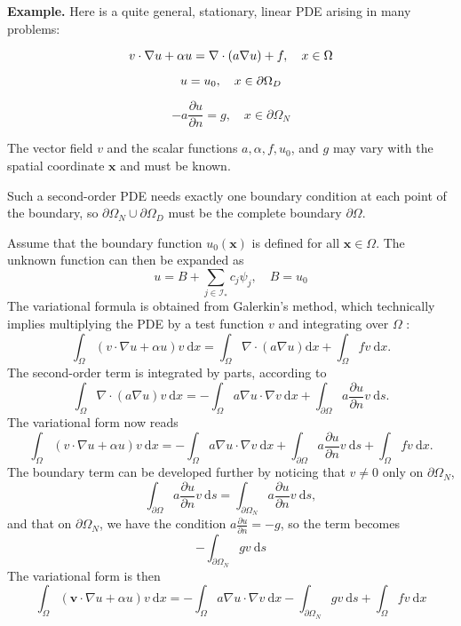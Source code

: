 \documentclass[../main.tex]{subfiles}
\begin{document}
	\textbf{Example.   } Here is a quite general, stationary, linear PDE arising in many problems:
	
	\begin{equation}
		\label{eqa198}
		v \cdot \nabla u+\alpha u=\nabla \cdot(a \nabla u)+f, \quad x \in \Omega \\
	\end{equation}

	\begin{equation}
		\label{eqa199}
		u=u_{0}, \quad x \in \partial \Omega_{D} \\
	\end{equation}

	\begin{equation}
		\label{eqa200}
		-a \frac{\partial u}{\partial n}=g, \quad x \in \partial \Omega_{N}
	\end{equation}
	
	\noindent The vector field $v$ and the scalar functions $a, \alpha, f, u_{0}$, and $g$ may vary with the spatial coordinate $\boldsymbol{x}$ and must be known.
	
	Such a second-order PDE needs exactly one boundary condition at each point of the boundary, so $\partial \Omega_{N} \cup \partial \Omega_{D}$ must be the complete boundary $\partial \Omega$.
	
	Assume that the boundary function $u_{0}(\boldsymbol{x})$ is defined for all $\boldsymbol{x} \in \Omega$. The unknown function can then be expanded as
	$$
	u=B+\sum_{j \in \mathcal{I}_{*}} c_{j} \psi_{j}, \quad B=u_{0}
	$$
	The variational formula is obtained from Galerkin's method, which technically implies multiplying the PDE by a test function $v$ and integrating over $\Omega$ :
	$$
	\int_{\Omega}(v \cdot \nabla u+\alpha u) v \mathrm{~d} x=\int_{\Omega} \nabla \cdot(a \nabla u) \mathrm{d} x+\int_{\Omega} f v \mathrm{~d} x .
	$$
	The second-order term is integrated by parts, according to
	$$
	\int_{\Omega} \nabla \cdot(a \nabla u) v \mathrm{~d} x=-\int_{\Omega} a \nabla u \cdot \nabla v \mathrm{~d} x+\int_{\partial \Omega} a \frac{\partial u}{\partial n} v \mathrm{~d} s .
	$$
	The variational form now reads
	$$
	\int_{\Omega}(v \cdot \nabla u+\alpha u) v \mathrm{~d} x=-\int_{\Omega} a \nabla u \cdot \nabla v \mathrm{~d} x+\int_{\partial \Omega} a \frac{\partial u}{\partial n} v \mathrm{~d} s+\int_{\Omega} f v \mathrm{~d} x .
	$$
	The boundary term can be developed further by noticing that $v \neq 0$ only on $\partial \Omega_{N}$,
	$$
	\int_{\partial \Omega} a \frac{\partial u}{\partial n} v \mathrm{~d} s=\int_{\partial \Omega_{N}} a \frac{\partial u}{\partial n} v \mathrm{~d} s,
	$$
	and that on $\partial \Omega_{N}$, we have the condition $a \frac{\partial u}{\partial n}=-g$, so the term becomes
	$$
	-\int_{\partial \Omega_{N}} g v \mathrm{~d} s
	$$
	The variational form is then
	$$
	\int_{\Omega}(\boldsymbol{v} \cdot \nabla u+\alpha u) v \mathrm{~d} x=-\int_{\Omega} a \nabla u \cdot \nabla v \mathrm{~d} x-\int_{\partial \Omega_{N}} g v \mathrm{~d} s+\int_{\Omega} f v \mathrm{~d} x
	$$
	
\end{document}
